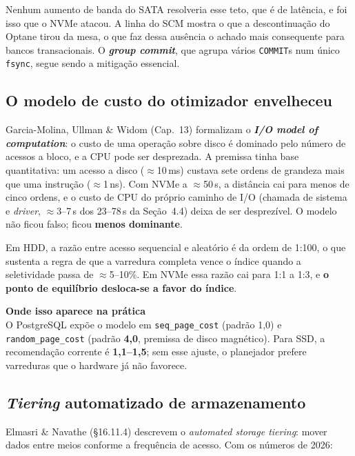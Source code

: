 \documentclass[11pt,a4paper]{article}
\newcommand{\destaque}[2]{%
  \begin{center}\begin{minipage}{0.97\textwidth}
  \colorbox{fundo}{\begin{minipage}{\dimexpr\linewidth-2\fboxsep}
  \vspace{3pt}\textbf{\color{azul}#1}\\[2pt]\small #2\vspace{3pt}
  \end{minipage}}\end{minipage}\end{center}}
\newcommand{\us}{\,\textmu s}
\begin{document}
Nenhum aumento de banda do SATA resolveria esse teto, que é de latência, e foi isso que o
NVMe atacou. A linha do SCM mostra o que a descontinuação do Optane tirou da mesa, o que faz
dessa ausência o achado mais consequente para bancos transacionais. O \textbf{\emph{group
commit}}, que agrupa vários \texttt{COMMIT}s num único \texttt{fsync}, segue sendo a mitigação
essencial.

\subsection{O modelo de custo do otimizador envelheceu}

Garcia-Molina, Ullman \& Widom (Cap.~13) formalizam o \textbf{\emph{I/O model of
computation}}: o custo de uma operação sobre disco é dominado pelo número de acessos a bloco,
e a CPU pode ser desprezada. A premissa tinha base quantitativa: um acesso a disco
($\approx$10\,ms) custava sete ordens de grandeza mais que uma instrução ($\approx$1\,ns). Com
NVMe a $\approx$50\us, a distância cai para menos de cinco ordens, e o custo de CPU do próprio
caminho de I/O (chamada de sistema e \emph{driver}, $\approx$3--7\us{} dos 23--78\us{} da
Seção~4.4) deixa de ser desprezível. O modelo não ficou falso; ficou \textbf{menos dominante}.

Em HDD, a razão entre acesso sequencial e aleatório é da ordem de 1:100, o que sustenta a regra
de que a varredura completa vence o índice quando a seletividade passa de $\approx$5--10\%. Em
NVMe essa razão cai para 1:1 a 1:3, e \textbf{o ponto de equilíbrio desloca-se a favor do
índice}.

\destaque{Onde isso aparece na prática}{%
O PostgreSQL expõe o modelo em \texttt{seq\_page\_cost} (padrão 1,0) e \texttt{random\_page\_cost}
(padrão \textbf{4,0}, premissa de disco magnético). Para SSD, a recomendação corrente é
\textbf{1,1--1,5}; sem esse ajuste, o planejador prefere varreduras que o hardware já não
favorece.}

\subsection{\emph{Tiering} automatizado de armazenamento}

Elmasri \& Navathe (§16.11.4) descrevem o \emph{automated storage tiering}: mover dados entre
meios conforme a frequência de acesso. Com os números de 2026:
\end{document}
